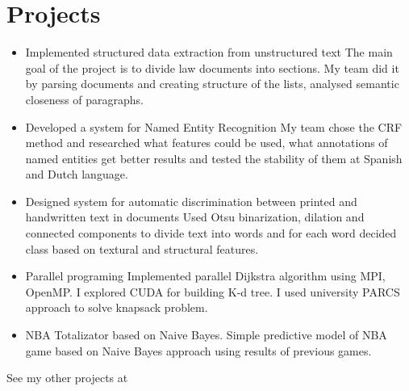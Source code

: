 \documentclass[letterpaper]{twentysecondcv} %
\begin{document}
\section{Projects}
\begin{itemize}
    \item \projectItem
        {Implemented structured data extraction from unstructured text }
        {The main goal of the project is to divide law documents into sections. My team did it by parsing documents and creating structure of the lists, analysed semantic closeness of paragraphs.}

	\item \projectItem
        {Developed a system for Named Entity Recognition}
        {My team chose the CRF method and researched what features could be used, what annotations of named entities get better results and tested the stability of them at Spanish and Dutch language.}

    \item \projectItem
        {Designed system for automatic discrimination between printed and handwritten text in documents}
        {Used Otsu binarization, dilation and connected components to divide text into words and for each word decided class based on textural and structural features.}
	\item \projectItem
        {Parallel programing}
        {Implemented parallel Dijkstra algorithm using MPI, OpenMP. I explored CUDA for building K-d tree. I used university PARCS approach to solve knapsack problem.}
	\item \projectItem
        {NBA Totalizator based on Naive Bayes.}
        {Simple predictive model of NBA game based on Naive Bayes approach using results of previous games.}
\end{itemize}
\projectItem
    {See my other projects at  }
    {}
\end{document}
